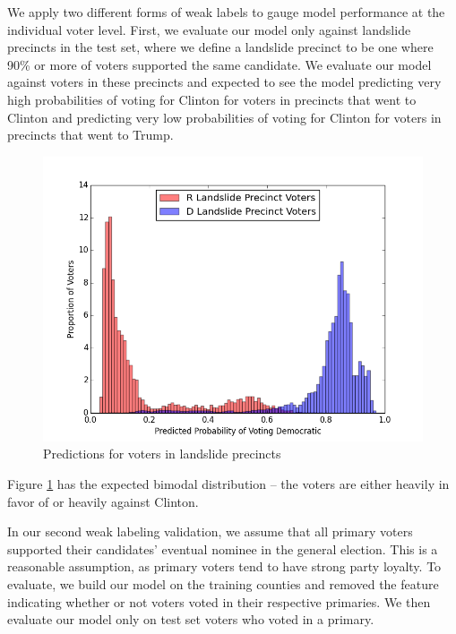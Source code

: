 \documentclass[10pt, letterpaper]{article}
\begin{document}
\begin{multicols}{2}
We apply two different forms of weak labels to gauge model performance at the individual voter level. First, we evaluate our model only against landslide precincts in the test set, where we define a landslide precinct to be one where 90\% or more of voters supported the same candidate. We evaluate our model against voters in these precincts and expected to see the model predicting very high probabilities of voting for Clinton for voters in precincts that went to Clinton and predicting very low probabilities of voting for Clinton for voters in precincts that went to Trump.

\begin{figure}[H]
\begin{center}
\includegraphics[scale=0.3]{lanslideHist19}
\end{center}
\caption{Predictions for voters in landslide precincts}
\label{fig:lanslideHist19}
\end{figure}

Figure \ref{fig:lanslideHist19} has the expected bimodal distribution -- the voters are either heavily in favor of or heavily against Clinton.

In our second weak labeling validation, we assume that all primary voters supported their candidates' eventual nominee in the general election. This is a reasonable assumption, as primary voters tend to have strong party loyalty. To evaluate, we build our model on the training counties and removed the feature indicating whether or not voters voted in their respective primaries. We then evaluate our model only on test set voters who voted in a primary.


\end{multicols}
\end{document}
